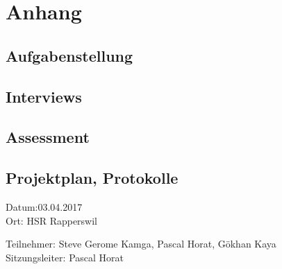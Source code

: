 \chapter*{Anhang}
\label{sec:Anhang}

\section*{Aufgabenstellung}

\section*{Interviews}

\section*{Assessment}







\section*{Projektplan, Protokolle}

Datum:03.04.2017\\
Ort: HSR Rapperswil

Teilnehmer: Steve Gerome Kamga, Pascal Horat, Gökhan Kaya\\
Sitzungsleiter: Pascal Horat

